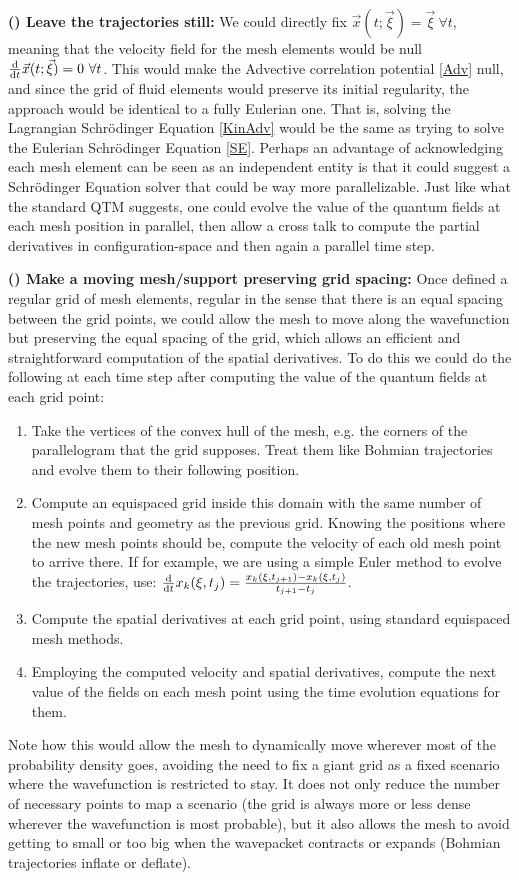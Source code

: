 \documentclass[11pt, a4paper]{article} %
\begin{document}
{\bf (\textalpha) Leave the trajectories still: } We could directly fix $\vec{x}(t;\vec{\xi})=\vec{\xi}\ \forall t$, meaning that the velocity field for the mesh elements would be null $\dv{}{t}\vec{x}(t;\vec{\xi})=0\ \forall t$. This would make the Advective correlation potential \eqref{Adv} null, and since the grid of fluid elements would preserve its initial regularity, the approach would be identical to a fully Eulerian one. That is, solving the Lagrangian Schrödinger Equation \eqref{KinAdv} would be the same as trying to solve the Eulerian Schrödinger Equation \eqref{SE}. Perhaps an advantage of acknowledging each mesh element can be seen as an independent entity is that it could suggest a Schrödinger Equation solver that could be way more parallelizable. Just like what the standard QTM suggests, one could evolve the value of the quantum fields at each mesh position in parallel, then allow a cross talk to compute the partial derivatives in configuration-space and then again a parallel time step.

{\bf (\textbeta) Make a moving mesh/support preserving grid spacing:} Once defined a regular grid of mesh elements, regular in the sense that there is an equal spacing between the grid points, we could allow the mesh to move along the wavefunction but preserving the equal spacing of the grid, which allows an efficient and straightforward computation of the spatial derivatives. To do this we could do the following at each time step after computing the value of the quantum fields at each grid point:
\begin{enumerate}
\item Take the vertices of the convex hull of the mesh, e.g. the corners of the parallelogram that the grid supposes. Treat them like Bohmian trajectories and evolve them to their following position.
\item Compute an equispaced grid inside this domain with the same number of mesh points and geometry as the previous grid. Knowing the positions where the new mesh points should be, compute the velocity of each old mesh point to arrive there. If for example, we are using a simple Euler method to evolve the trajectories, use: $\dv{}{t}x_k(\xi,t_{j})=\frac{x_k(\xi,t_{j+1})-x_k(\xi,t_{j})}{t_{j+1}-t_j}$.
\item Compute the spatial derivatives at each grid point, using standard equispaced mesh methods.
\item Employing the computed velocity and spatial derivatives, compute the next value of the fields on each mesh point using the time evolution equations for them.
\end{enumerate}
Note how this would allow the mesh to dynamically move wherever most of the probability density goes, avoiding the need to fix a giant grid as a fixed scenario where the wavefunction is restricted to stay. It does not only reduce the number of necessary points to map a scenario (the grid is always more or less dense wherever the wavefunction is most probable), but it also allows the mesh to avoid getting to small or too big when the wavepacket contracts or expands (Bohmian trajectories inflate or deflate). 
 
\end{document}
